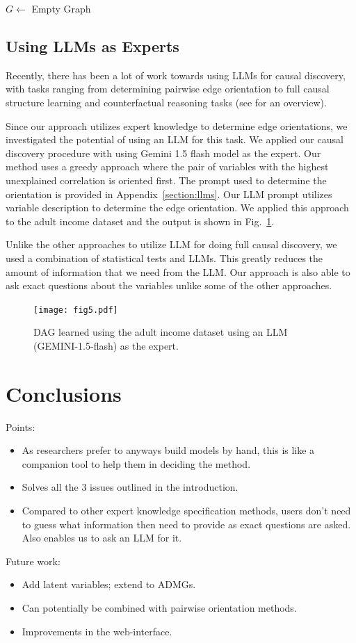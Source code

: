 \documentclass{uai2025} %
\begin{document}
\begin{algorithm}
	\BlankLine
	$ G \leftarrow $ Empty Graph
\end{algorithm}


\subsection{Using LLMs as Experts}
Recently, there has been a lot of work towards using LLMs for causal discovery,
with tasks ranging from determining pairwise edge orientation
\citep{Kiciman2023, Jin2024} to full causal structure learning \citep{Naik2023,
Vashishtha2023} and counterfactual reasoning tasks\citep{Kiciman2023} (see
\citet{Liu2024} for an overview).

Since our approach utilizes expert knowledge to determine edge orientations, we
investigated the potential of using an LLM for this task. We applied our causal
discovery procedure with using Gemini 1.5 flash model as the expert. Our method
uses a greedy approach where the pair of variables with the highest unexplained
correlation is oriented first. The prompt used to determine the orientation is
provided in Appendix~\ref{section:llms}. Our LLM prompt utilizes variable
description to determine the edge orientation. We applied this approach to the
adult income dataset and the output is shown in Fig.~\ref{fig:adult_llm}. 

Unlike the other approaches to utilize LLM for doing full causal discovery, we 
used a combination of statistical tests and LLMs. This greatly reduces the
amount of information that we need from the LLM. Our approach is also able to 
ask exact questions about the variables unlike some of the other approaches.

\begin{figure}[t!]
	\centering
	\texttt{[image: fig5.pdf]}
	\caption{DAG learned using the adult income dataset using an LLM (GEMINI-1.5-flash) as the expert.}
	\label{fig:adult_llm}
\end{figure}

\section{Conclusions}
Points:
\begin{itemize}
	\item As researchers prefer to anyways build models by hand, this is like a companion tool to help them in deciding the method.
	\item Solves all the $ 3 $ issues outlined in the introduction.
	\item Compared to other expert knowledge specification methods, users don't need to guess what information then need to provide as exact questions are asked. Also enables us to ask an LLM for it.
\end{itemize}

Future work:
\begin{itemize}
	\item Add latent variables; extend to ADMGs.
	\item Can potentially be combined with pairwise orientation methods.
	\item Improvements in the web-interface.
\end{itemize}



\newpage


\end{document}
